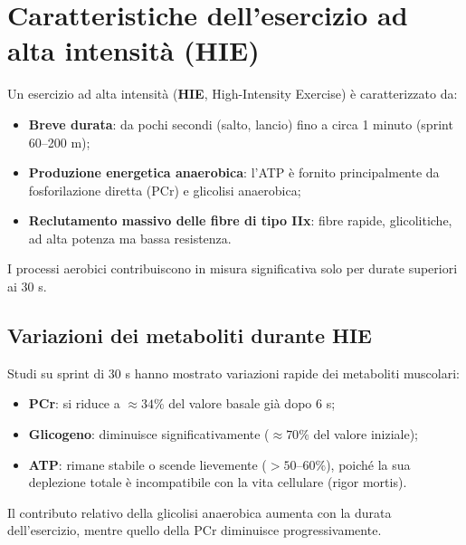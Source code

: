 \documentclass[12pt,a4paper]{report}
\begin{document}
\section{Caratteristiche dell'esercizio ad alta intensità (HIE)}
Un esercizio ad alta intensità (\textbf{HIE}, High-Intensity Exercise) è caratterizzato da:
\begin{itemize}
\item \textbf{Breve durata}: da pochi secondi (salto, lancio) fino a circa 1 minuto (sprint 60--200 m);
\item \textbf{Produzione energetica anaerobica}: l'ATP è fornito principalmente da fosforilazione diretta (PCr) e glicolisi anaerobica;
\item \textbf{Reclutamento massivo delle fibre di tipo IIx}: fibre rapide, glicolitiche, ad alta potenza ma bassa resistenza.
\end{itemize}
I processi aerobici contribuiscono in misura significativa solo per durate superiori ai 30 s.
\subsection{Variazioni dei metaboliti durante HIE}
Studi su sprint di 30 s hanno mostrato variazioni rapide dei metaboliti muscolari:
\begin{itemize}
\item \textbf{PCr}: si riduce a $\approx 34\%$ del valore basale già dopo 6 s;
\item \textbf{Glicogeno}: diminuisce significativamente ($\approx 70\%$ del valore iniziale);
\item \textbf{ATP}: rimane stabile o scende lievemente ($>50\text{--}60\%$), poiché la sua deplezione totale è incompatibile con la vita cellulare (rigor mortis).
\end{itemize}
Il contributo relativo della glicolisi anaerobica aumenta con la durata dell'esercizio, mentre quello della PCr diminuisce progressivamente.
\end{document}
